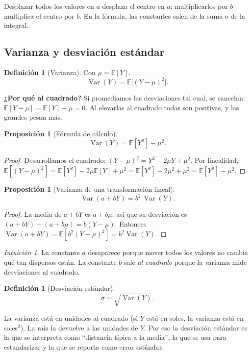 \documentclass[11pt,a4paper]{article}
\theoremstyle{plain}
\newtheorem{proposicion}[teorema]{Proposición}
\theoremstyle{definition}
\newtheorem{definicion}[teorema]{Definición}
\theoremstyle{remark}
\newtheorem*{intuicion}{Intuición}
\newcommand{\E}{\mathbb{E}}
\DeclareMathOperator{\Var}{Var}
\begin{document}
Desplazar todos los valores en $a$ desplaza el centro en $a$; multiplicarlos por $b$
multiplica el centro por $b$. En la fórmula, las constantes salen de la suma o de la integral.

\subsection{Varianza y desviación estándar}

\begin{definicion}[Varianza]\label{def:var}
Con $\mu=\E[Y]$,
\[
\Var(Y)=\E\big[(Y-\mu)^2\big].
\]
\end{definicion}

\textbf{¿Por qué al cuadrado?} Si promediamos las desviaciones tal cual, se cancelan:
$\E[Y-\mu]=\E[Y]-\mu=0$. Al elevarlas al cuadrado todas son positivas, y las grandes pesan más.

\begin{proposicion}[Fórmula de cálculo]\label{prop:varcalc}
\[
\Var(Y)=\E[Y^2]-\mu^2 .
\]
\end{proposicion}
\begin{proof}
Desarrollamos el cuadrado: $(Y-\mu)^2=Y^2-2\mu Y+\mu^2$. Por linealidad,
$\E[(Y-\mu)^2]=\E[Y^2]-2\mu\E[Y]+\mu^2=\E[Y^2]-2\mu^2+\mu^2=\E[Y^2]-\mu^2$.
\end{proof}

\begin{proposicion}[Varianza de una transformación lineal]\label{prop:varlin}
\[
\Var(a+bY)=b^2\,\Var(Y).
\]
\end{proposicion}
\begin{proof}
La media de $a+bY$ es $a+b\mu$, así que su desviación es $(a+bY)-(a+b\mu)=b(Y-\mu)$.
Entonces $\Var(a+bY)=\E[b^2(Y-\mu)^2]=b^2\Var(Y)$.
\end{proof}

\begin{intuicion}
La constante $a$ desaparece porque mover todos los valores no cambia qué tan dispersos
están. La constante $b$ sale \emph{al cuadrado} porque la varianza mide desviaciones al
cuadrado.
\end{intuicion}

\begin{definicion}[Desviación estándar]\label{def:sd}
\[
\sigma=\sqrt{\Var(Y)}.
\]
\end{definicion}

La varianza está en unidades al cuadrado (si $Y$ está en soles, la varianza está en
soles$^2$). La raíz la devuelve a las unidades de $Y$. Por eso la desviación estándar es la
que se interpreta como ``distancia típica a la media'', la que se usa para estandarizar y la
que se reporta como error estándar.
\end{document}
